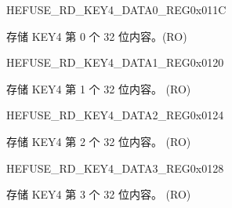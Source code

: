 \begin{register}{H}{EFUSE\_RD\_KEY4\_DATA0\_REG}{0x011C}\label{regdesc:EFUSERDKEY4DATA0REG}
%
\regnewline%
\begin{regdesc}\begin{reglist}
\label{fielddesc:EFUSEKEY4DATA0}\item [EFUSE\_KEY4\_DATA0] 存储 KEY4 第 0 个 32 位内容。(RO)
\end{reglist}\end{regdesc}
\end{register}


\begin{register}{H}{EFUSE\_RD\_KEY4\_DATA1\_REG}{0x0120}\label{regdesc:EFUSERDKEY4DATA1REG}
%
\regnewline%
\begin{regdesc}\begin{reglist}
\label{fielddesc:EFUSEKEY4DATA1}\item [EFUSE\_KEY4\_DATA1] 存储 KEY4 第 1 个 32 位内容。 (RO)
\end{reglist}\end{regdesc}
\end{register}


\begin{register}{H}{EFUSE\_RD\_KEY4\_DATA2\_REG}{0x0124}\label{regdesc:EFUSERDKEY4DATA2REG}
%
\regnewline%
\begin{regdesc}\begin{reglist}
\label{fielddesc:EFUSEKEY4DATA2}\item [EFUSE\_KEY4\_DATA2] 存储 KEY4 第 2 个 32 位内容。 (RO)
\end{reglist}\end{regdesc}
\end{register}


\begin{register}{H}{EFUSE\_RD\_KEY4\_DATA3\_REG}{0x0128}\label{regdesc:EFUSERDKEY4DATA3REG}
%
\regnewline%
\begin{regdesc}\begin{reglist}
\label{fielddesc:EFUSEKEY4DATA3}\item [EFUSE\_KEY4\_DATA3] 存储 KEY4 第 3 个 32 位内容。 (RO)
\end{reglist}\end{regdesc}
\end{register}


